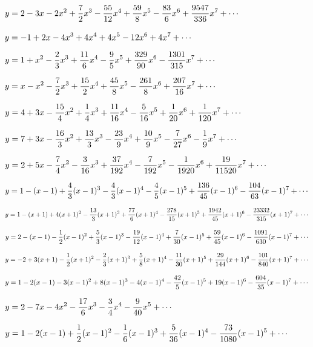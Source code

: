 \medskip

$y=\displaystyle{2-3x-2x^{2}+\frac{7}{2}x^{3}-\frac{55}{12}x^{4}+\frac{59}{8}x^{5}-\frac{83}{6}x^{6}
+\frac{9547}{336}x^{7}+\cdots}$

$y=\displaystyle{-1+2x-4x^{3}+4x^{4}+4x^{5}-12x^{6}+4x^{7}+\cdots}$

$y=\displaystyle{1+x^{2}-\frac{2}{3}x^{3}+\frac{11}{6}x^{4}-\frac{9}{5}x^{5}+
\frac{329}{90}x^{6}-\frac{1301}{315}x^{7}+\cdots}$

$y=\displaystyle{x-x^{2}-\frac{7}{2}x^{3}+\frac{15}{2}x^{4}+\frac{45}{8}x^{5}
-\frac{261}{8}x^{6}+\frac{207}{16}x^{7}+\cdots}$

$y=\displaystyle{4+3x-\frac{15}{4}x^{2}+\frac{1}{4}x^{3}+\frac{11}{16}x^{4}-\frac{5}{16}x^{5}
+\frac{1}{20}x^{6}+\frac{1}{120}x^{7}+\cdots}$

$y=\displaystyle{7+3x-\frac{16}{3}x^{2}+\frac{13}{3}x^{3}-\frac{23}{9}x^{4}+\frac{10}{9}x^{5}
-\frac{7}{27}x^{6}-\frac{1}{9}x^{7}+\cdots}$

$y=\displaystyle{2+5x-\frac{7}{4}x^{2}-\frac{3}{16}x^{3}+\frac{37}{192}x^{4}
-\frac{7}{192}x^{5}-\frac{1}{1920}x^{6}+\frac{19}{11520}x^{7}+\cdots}$

$y=\displaystyle{1-(x-1)+\frac{4}{3}(x-1)^{3}-\frac{4}{3}(x-1)^{4}-\frac{4}{5}(x-1)^{5}
+\frac{136}{45}(x-1)^{6}-\frac{104}{63}(x-1)^{7}+\cdots}$

$y=\displaystyle{1-(x+1)+4(x+1)^{2}-\frac{13}{3}(x+1)^{3}+\frac{77}{6}(x+1)^{4}
-\frac{278}{15}(x+1)^{5}+\frac{1942}{45}(x+1)^{6}-\frac{23332}{315}(x+1)^{7}+\cdots}$

$y=\displaystyle{2-(x-1)-\frac{1}{2}(x-1)^{2}+\frac{5}{3}(x-1)^{3}-\frac{19}{12}(x-1)^{4}
+\frac{7}{30}(x-1)^{5}+\frac{59}{45}(x-1)^{6}-\frac{1091}{630}(x-1)^{7}+\cdots}$

$y=\displaystyle{-2+3(x+1)-\frac{1}{2}(x+1)^{2}-\frac{2}{3}(x+1)^{3}+\frac{5}{8}(x+1)^{4}
-\frac{11}{30}(x+1)^{5}+\frac{29}{144}(x+1)^{6}-\frac{101}{840}(x+1)^{7}+\cdots}$

$y=\displaystyle{1-2(x-1)-3(x-1)^{2}+8(x-1)^{3}-4(x-1)^{4}-\frac{42}{5}(x-1)^{5}
+19(x-1)^{6}-\frac{604}{35}(x-1)^{7}+\cdots}$

$y=\displaystyle{2-7x-4x^{2}-\frac{17}{6}x^{3}-\frac{3}{4}x^{4}-\frac{9}{40}x^{5}+\cdots}$

$y=\displaystyle{1-2(x-1)+\frac{1}{2}(x-1)^{2}-\frac{1}{6}(x-1)^{3}+\frac{5}{36}(x-1)^{4}
-\frac{73}{1080}(x-1)^{5}+\cdots}$

